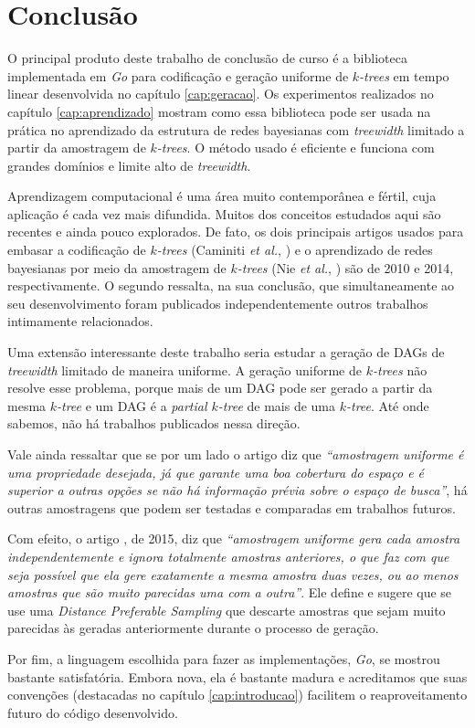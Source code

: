 \chapter{Conclusão}
\label{cap:conclusao}

O principal produto deste trabalho de conclusão de curso é a biblioteca implementada em \emph{Go} para codificação e geração uniforme de \emph{$k$-trees} em tempo linear desenvolvida no capítulo \ref{cap:geracao}. Os experimentos realizados no capítulo \ref{cap:aprendizado} mostram como essa biblioteca pode ser usada na prática no aprendizado da estrutura de redes bayesianas com \emph{treewidth} limitado a partir da amostragem de \emph{$k$-trees}. O método usado é eficiente e funciona com grandes domínios e limite alto de \emph{treewidth}.

Aprendizagem computacional é uma área muito contemporânea e fértil, cuja aplicação é cada vez mais difundida. Muitos dos conceitos estudados aqui são recentes e ainda pouco explorados. De fato, os dois principais artigos usados para embasar a codificação de \emph{$k$-trees} (Caminiti \emph{et al.}, \cite{caminiti}) e o aprendizado de redes bayesianas por meio da amostragem de \emph{$k$-trees} (Nie \emph{et al.}, \cite{maua}) são de 2010 e 2014, respectivamente. O segundo ressalta, na sua conclusão, que simultaneamente ao seu desenvolvimento foram publicados independentemente outros trabalhos intimamente relacionados.

Uma extensão interessante deste trabalho seria estudar a geração de DAGs de \emph{treewidth} limitado de maneira uniforme. A geração uniforme de \emph{$k$-trees} não resolve esse problema, porque mais de um DAG pode ser gerado a partir da mesma \emph{$k$-tree} e um DAG é a \emph{partial $k$-tree} de mais de uma \emph{$k$-tree}. Até onde sabemos, não há trabalhos publicados nessa direção.

Vale ainda ressaltar que se por um lado o artigo \cite{maua} diz que \emph{``amostragem uniforme é uma propriedade desejada, já que garante uma boa cobertura do espaço e é superior a outras opções se não há informação prévia sobre o espaço de busca''}, há outras amostragens que podem ser testadas e comparadas em trabalhos futuros.

Com efeito, o artigo \cite{nie}, de 2015, diz que \emph{``amostragem uniforme gera cada amostra independentemente e ignora totalmente amostras anteriores, o que faz com que seja possível que ela gere exatamente a mesma amostra duas vezes, ou ao menos amostras que são muito parecidas uma com a outra''}. Ele define e sugere que se use uma \emph{Distance Preferable Sampling} que descarte amostras que sejam muito parecidas às geradas anteriormente durante o processo de geração.

Por fim, a linguagem escolhida para fazer as implementações, \emph{Go}, se mostrou bastante satisfatória. Embora nova, ela é bastante madura e acreditamos que suas convenções (destacadas no capítulo \ref{cap:introducao}) facilitem o reaproveitamento futuro do código desenvolvido.
